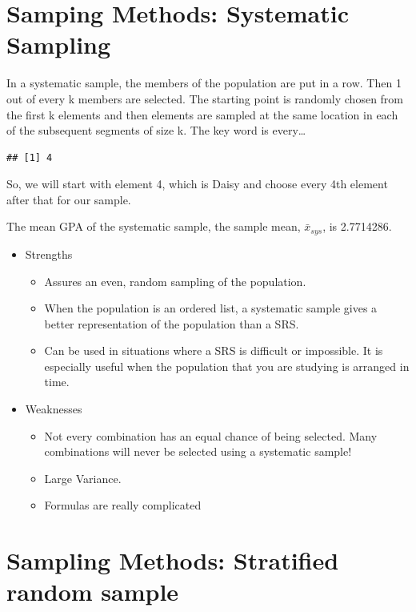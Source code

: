 \documentclass[]{book}
\providecommand{\tightlist}{%
  \setlength{\itemsep}{0pt}\setlength{\parskip}{0pt}}
\begin{document}
\hypertarget{samping-methods-systematic-sampling}{%
\section{Samping Methods: Systematic Sampling}\label{samping-methods-systematic-sampling}}

In a systematic sample, the members of the population are put in a row. Then 1 out of every k members are selected. The starting point is randomly chosen from the first k elements and then elements are sampled at the same location in each of the subsequent segments of size k. The key word is every\ldots{}

\begin{verbatim}
## [1] 4
\end{verbatim}

So, we will start with element 4, which is Daisy and choose every 4th element after that for our sample.

The mean GPA of the systematic sample, the sample mean, {\(\bar{x}_{sys}\)}, is 2.7714286.

\begin{itemize}
\tightlist
\item
  Strengths

  \begin{itemize}
  \tightlist
  \item
    Assures an even, random sampling of the population.
  \item
    When the population is an ordered list, a systematic sample gives a better representation of the population than a SRS.
  \item
    Can be used in situations where a SRS is difficult or impossible. It is especially useful when the population that you are studying is arranged in time.
  \end{itemize}
\item
  Weaknesses

  \begin{itemize}
  \tightlist
  \item
    Not every combination has an equal chance of being selected. Many combinations will never be selected
    using a systematic sample!
  \item
    Large Variance.
  \item
    Formulas are really complicated
  \end{itemize}
\end{itemize}

\hypertarget{sampling-methods-stratified-random-sample}{%
\section{Sampling Methods: Stratified random sample}\label{sampling-methods-stratified-random-sample}}
\end{document}
